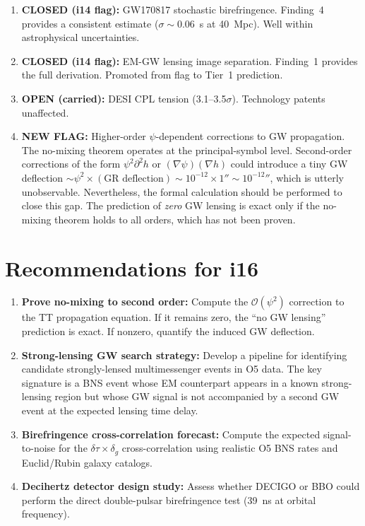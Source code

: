 \documentclass[11pt]{article}
\begin{document}
\begin{tcolorbox}[colback=red!5!white, colframe=red!60!black,
  title=\textbf{Inconsistency Flags --- W4i15}]

\begin{enumerate}
\item \textbf{CLOSED (i14 flag):} GW170817 stochastic birefringence.
  Finding~4 provides a consistent estimate ($\sigma \sim 0.06$~s at
  40~Mpc). Well within astrophysical uncertainties.

\item \textbf{CLOSED (i14 flag):} EM-GW lensing image separation.
  Finding~1 provides the full derivation. Promoted from flag to
  Tier~1 prediction.

\item \textbf{OPEN (carried):} DESI CPL tension (3.1--3.5$\sigma$).
  Technology patents unaffected.

\item \textbf{NEW FLAG:} Higher-order $\psi$-dependent corrections
  to GW propagation. The no-mixing theorem operates at the
  principal-symbol level. Second-order corrections of the form
  $\psi^2\partial^2 h$ or $(\nabla\psi)(\nabla h)$ could introduce
  a tiny GW deflection $\sim \psi^2 \times (\text{GR deflection})
  \sim 10^{-12}\times 1'' \sim 10^{-12}''$, which is utterly
  unobservable. Nevertheless, the formal calculation should be
  performed to close this gap. The prediction of \emph{zero} GW
  lensing is exact only if the no-mixing theorem holds to all
  orders, which has not been proven.
\end{enumerate}
\end{tcolorbox}

\section{Recommendations for i16}

\begin{enumerate}
\item \textbf{Prove no-mixing to second order:} Compute the
  $\mathcal{O}(\psi^2)$ correction to the TT propagation equation.
  If it remains zero, the ``no GW lensing'' prediction is exact.
  If nonzero, quantify the induced GW deflection.
\item \textbf{Strong-lensing GW search strategy:} Develop a pipeline
  for identifying candidate strongly-lensed multimessenger events
  in O5 data. The key signature is a BNS event whose EM counterpart
  appears in a known strong-lensing region but whose GW signal is
  not accompanied by a second GW event at the expected lensing time
  delay.
\item \textbf{Birefringence cross-correlation forecast:} Compute the
  expected signal-to-noise for the $\delta\tau \times \delta_g$
  cross-correlation using realistic O5 BNS rates and Euclid/Rubin
  galaxy catalogs.
\item \textbf{Decihertz detector design study:} Assess whether
  DECIGO or BBO could perform the direct double-pulsar birefringence
  test (39~ns at orbital frequency).
\end{enumerate}
\end{document}
